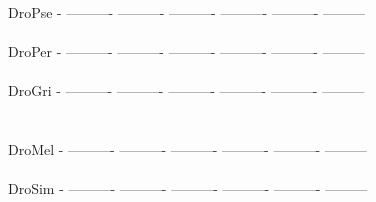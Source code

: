 \documentclass[11pt,twoside,reqno,a4paper]{article}
\begin{document}
{DroPse	-	----------	----------	----------	----------	----------	---------\\
\hspace*{7\charwidth}\hspace*{1\charwidth}\hspace*{1\charwidth}\hspace*{1\charwidth}\hspace*{1\charwidth}\hspace*{1\charwidth}\hspace*{1\charwidth}\\
DroPer	-	----------	----------	----------	----------	----------	---------\\
\hspace*{7\charwidth}\hspace*{1\charwidth}\hspace*{1\charwidth}\hspace*{1\charwidth}\hspace*{1\charwidth}\hspace*{1\charwidth}\hspace*{1\charwidth}\\
DroGri	-	----------	----------	----------	----------	----------	---------\\
\hspace*{7\charwidth}\hspace*{1\charwidth}\hspace*{1\charwidth}\hspace*{1\charwidth}\hspace*{1\charwidth}\hspace*{1\charwidth}\hspace*{1\charwidth}\\
\\
DroMel	-	----------	----------	----------	----------	----------	---------\\
\hspace*{7\charwidth}\hspace*{1\charwidth}\hspace*{1\charwidth}\hspace*{1\charwidth}\hspace*{1\charwidth}\hspace*{1\charwidth}\hspace*{1\charwidth}\\
DroSim	-	----------	----------	----------	----------	----------	---------\\
\hspace*{7\charwidth}\hspace*{1\charwidth}\hspace*{1\charwidth}\hspace*{1\charwidth}\hspace*{1\charwidth}\hspace*{1\charwidth}\hspace*{1\charwidth}\\
}
\end{document}
